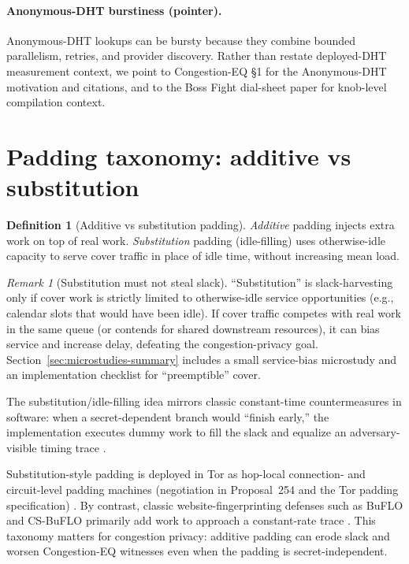 \documentclass[11pt]{article}
\theoremstyle{definition}
\newtheorem{definition}{Definition}
\theoremstyle{remark}
\newtheorem{remark}{Remark}
\begin{document}
\paragraph{Anonymous-DHT burstiness (pointer).}
Anonymous-DHT lookups can be bursty because they combine bounded parallelism, retries, and provider discovery.
Rather than restate deployed-DHT measurement context, we point to Congestion-EQ \S1 for the Anonymous-DHT motivation and citations, and to the Boss Fight dial-sheet paper for knob-level compilation context.


\section{Padding taxonomy: additive vs substitution}
\begin{definition}[Additive vs substitution padding]
\emph{Additive} padding injects extra work on top of real work.
\emph{Substitution} padding (idle-filling) uses otherwise-idle capacity to serve cover traffic in place of idle time, without increasing mean load.
\end{definition}

\begin{remark}[Substitution must not steal slack]
``Substitution'' is slack-harvesting only if cover work is strictly limited to otherwise-idle service opportunities (e.g., calendar slots that would have been idle).
If cover traffic competes with real work in the same queue (or contends for shared downstream resources), it can bias service and increase delay, defeating the congestion-privacy goal.
Section~\ref{sec:microstudies-summary} includes a small service-bias microstudy and an implementation checklist for ``preemptible'' cover.
\end{remark}

The substitution/idle-filling idea mirrors classic constant-time countermeasures in software: when a secret-dependent branch would ``finish early,'' the implementation executes dummy work to fill the slack and equalize an adversary-visible timing trace \cite{agat2000,mishra_fallthrough2025}.

Substitution-style padding is deployed in Tor as hop-local connection- and circuit-level padding machines (negotiation in Proposal~254 and the Tor padding specification) \cite{torproposal254,torpaddingspec}.
By contrast, classic website-fingerprinting defenses such as BuFLO and CS-BuFLO primarily add work to approach a constant-rate trace \cite{dyer2012peekaboo,csbuflo}.
This taxonomy matters for congestion privacy: additive padding can erode slack and worsen Congestion-EQ witnesses even when the padding is secret-independent.
\end{document}

